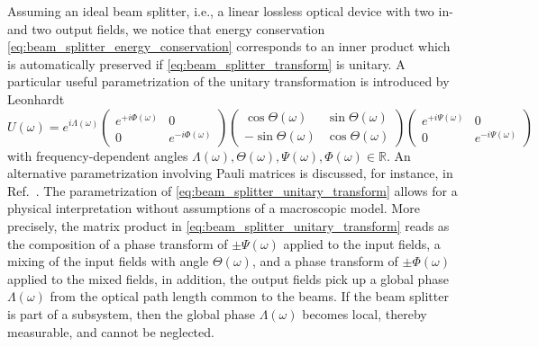 Assuming an ideal beam splitter, i.e., a linear lossless optical device with two in- and two output fields, we notice that energy conservation \cref{eq:beam_splitter_energy_conservation} corresponds to an inner product which is automatically preserved if \cref{eq:beam_splitter_transform} is unitary.
A particular useful parametrization of the unitary transformation is introduced by Leonhardt~\cite[p.~92]{Leonhardt2010}
\begin{equation}
	U(\omega)
	=
    e^{i\Lambda(\omega)}
    \begin{pmatrix}
        e^{+i\Phi(\omega)} & 0
        \\
        0 & e^{-i\Phi(\omega)}
    \end{pmatrix}
    \begin{pmatrix}
        \cos\Theta(\omega) & \sin\Theta(\omega)
        \\
        -\sin\Theta(\omega) & \cos\Theta(\omega)
    \end{pmatrix}
    \begin{pmatrix}
        e^{+i\Psi(\omega)} & 0
        \\
        0 & e^{-i\Psi(\omega)}
    \end{pmatrix}
    \label{eq:beam_splitter_unitary_transform}
\end{equation}
with frequency-dependent angles $\Lambda(\omega),\Theta(\omega),\Psi(\omega),\Phi(\omega)\in\mathbb{R}$.
An alternative parametrization involving Pauli matrices is discussed, for instance, in Ref.~\cite{Zeilinger1981}.
The parametrization of \cref{eq:beam_splitter_unitary_transform} allows for a physical interpretation without assumptions of a macroscopic model.
More precisely, the matrix product in \cref{eq:beam_splitter_unitary_transform} reads as the composition of a phase transform of $\pm\Psi(\omega)$ applied to the input fields, a mixing of the input fields with angle $\Theta(\omega)$, and a phase transform of $\pm\Phi(\omega)$ applied to the mixed fields, in addition, the output fields pick up a global phase $\Lambda(\omega)$ from the optical path length common to the beams.
If the beam splitter is part of a subsystem, then the global phase $\Lambda(\omega)$ becomes local, thereby measurable, and cannot be neglected.

